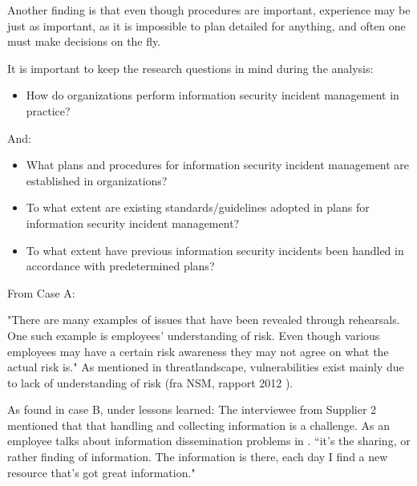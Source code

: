 Another finding is that even though procedures are important, experience may be just as important, as it is impossible to plan detailed for anything, and often one must make decisions on the fly.

It is important to keep the research questions in mind during the analysis:

\begin{itemize}
\item How do organizations perform information security incident management in practice?
\end{itemize}

And:

\begin{itemize}\itemsep-0.1cm
\item What plans and procedures for information security incident management are established in organizations?
\item To what extent are existing standards/guidelines adopted in plans for information security incident management?
\item To what extent have previous information security incidents been handled in accordance with predetermined plans? 
\end{itemize}

From Case A:

"There are many examples of issues that have been revealed through rehearsals. One such example is employees' understanding of risk. Even though various employees may have a certain risk awareness they may not agree on what the actual risk is."
As mentioned in threatlandscape, vulnerabilities exist mainly due to lack of understanding of risk (fra NSM, rapport 2012 \cite{NSMRapport2012}).

As found in case B, under lessons learned:
The interviewee from Supplier 2 mentioned that that handling and collecting information is a challenge. As an employee talks about information dissemination problems in \cite{ahmad2012incident}.
``it's the sharing, or rather finding of information. The information is there, each day I find a new resource that's got great information."
